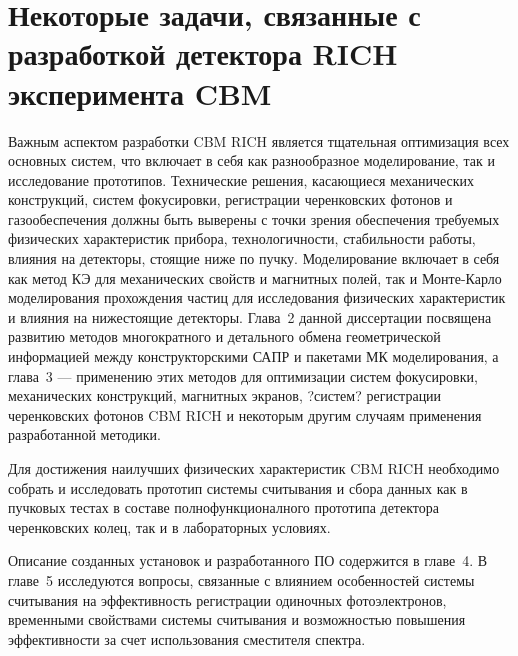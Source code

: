 \section{Некоторые задачи, связанные с разработкой детектора RICH эксперимента CBM}


Важным аспектом разработки CBM RICH является тщательная оптимизация всех основных систем, что включает в себя как разнообразное моделирование, так и исследование прототипов. Технические решения, касающиеся механических конструкций, систем фокусировки, регистрации черенковских фотонов и газообеспечения должны быть выверены с точки зрения обеспечения требуемых физических характеристик прибора, технологичности, стабильности работы, влияния на детекторы, стоящие ниже по пучку.
Моделирование включает в себя как метод КЭ для механических свойств и магнитных полей, так и Монте-Карло моделирования прохождения частиц для исследования физических характеристик и влияния на нижестоящие детекторы.
Глава~2 данной диссертации посвящена развитию методов многократного и детального обмена геометрической информацией между конструкторскими САПР и пакетами МК моделирования, а глава~3 --- применению этих методов для оптимизации систем фокусировки, механических конструкций, магнитных экранов, ?систем? регистрации черенковских фотонов CBM RICH и некоторым другим случаям применения разработанной методики.
% 

Для достижения наилучших физических характеристик CBM RICH необходимо собрать и исследовать прототип системы считывания и сбора данных как в пучковых тестах в составе полнофункционалного прототипа детектора черенковских колец, так и в лабораторных условиях.

Описание созданных установок и разработанного ПО содержится в главе~4.
В главе~5 исследуются вопросы, связанные с
влиянием особенностей системы считывания на эффективность регистрации одиночных фотоэлектронов,
временными свойствами системы считывания и
возможностью повышения эффективности за счет использования сместителя спектра.
